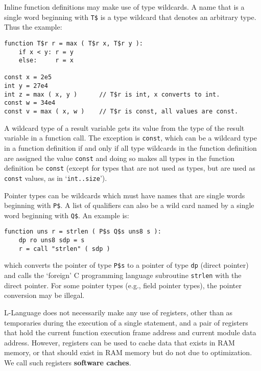 \documentclass[12pt]{article}
\newcommand{\skey}[2]{{\rm \bfseries #1#2}}
\newenvironment{indpar}[1][0.3in]%
	{\begin{list}{}%
		     {\setlength{\itemsep}{0in}%
		      \setlength{\topsep}{0in}%
		      \setlength{\parsep}{1ex}%
		      \setlength{\labelwidth}{#1}%
		      \setlength{\leftmargin}{#1}%
		      \addtolength{\leftmargin}{\labelsep}}%
	 \item}%
	{\end{list}}
\begin{document}
Inline function definitions may make use of type wildcards.
A name that is a single word beginning with {\tt T\$}
is a type wildcard that denotes
an arbitrary type.  Thus the example:

\begin{indpar}\begin{verbatim}
function T$r r = max ( T$r x, T$r y ):
    if x < y: r = y
    else:     r = x

const x = 2e5
int y = 27e4
int z = max ( x, y )      // T$r is int, x converts to int.
const w = 34e4
const v = max ( x, w )    // T$r is const, all values are const.
\end{verbatim}\end{indpar}

A wildcard type of a result variable gets its value from the
type of the result variable in a function call.  The exception
is {\tt const}, which can be a wildcard type in a function
definition if and only if all type wildcards in the function definition
are assigned the value {\tt const} and doing so makes
all types in the function definition be {\tt const}
(except for types that are not used as types, but are used as
{\tt const} values, as in `{\tt int..size}').

Pointer types can be wildcards which must have names that are
single words beginning with {\tt P\$}.  A list of qualifiers
can also be a wild card named by a single word beginning with
{\tt Q\$}.  An example is:

\begin{indpar}\begin{verbatim}
function uns r = strlen ( P$s Q$s uns8 s ):
    dp ro uns8 sdp = s
    r = call "strlen" ( sdp )
\end{verbatim}\end{indpar}

which converts the pointer of type {\tt P\$s} to a pointer of
type {\tt dp} (direct pointer) and calls the `foreign' C programming
language subroutine {\tt strlen} with the direct pointer.
For some pointer types (e.g., field pointer types),
the pointer conversion may be illegal.

L-Language does not necessarily make any use of registers, other
than as temporaries during the execution of a single statement,
and a pair of registers that hold the current function
execution frame address and current module data address.
However, registers can be used to cache data that exists in
RAM memory, or that should exist in RAM memory but do not
due to optimization.  We call such registers
\skey{software cach}{es}.
\end{document}
